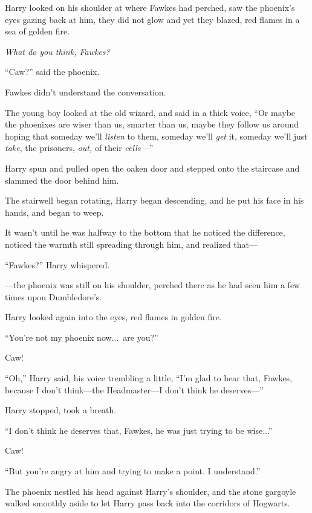 Harry looked on his shoulder at where Fawkes had perched, saw the phoenix’s eyes gazing back at him, they did not glow and yet they blazed, red flames in a sea of golden fire.

\emph{What do you think, Fawkes?}

“Caw?” said the phoenix.

Fawkes didn’t understand the conversation.

The young boy looked at the old wizard, and said in a thick voice, “Or maybe the phoenixes are wiser than us, smarter than us, maybe they follow us around hoping that someday we’ll \emph{listen} to them, someday we’ll \emph{get} it, someday we’ll just \emph{take}, the prisoners, \emph{out,} of their \emph{cells—}”

Harry spun and pulled open the oaken door and stepped onto the staircase and slammed the door behind him.

The stairwell began rotating, Harry began descending, and he put his face in his hands, and began to weep.

It wasn’t until he was halfway to the bottom that he noticed the difference, noticed the warmth still spreading through him, and realized that—

“Fawkes?” Harry whispered.

—the phoenix was still on his shoulder, perched there as he had seen him a few times upon Dumbledore’s.

Harry looked again into the eyes, red flames in golden fire.

“You’re not my phoenix now...\ are you?”

Caw!

“Oh,” Harry said, his voice trembling a little, “I’m glad to hear that, Fawkes, because I don’t think—the Headmaster—I don’t think he deserves—”

Harry stopped, took a breath.

“I don’t think he deserves that, Fawkes, he was just trying to be wise...”

Caw!

“But you’re angry at him and trying to make a point. I understand.”

The phoenix nestled his head against Harry’s shoulder, and the stone gargoyle walked smoothly aside to let Harry pass back into the corridors of Hogwarts.

